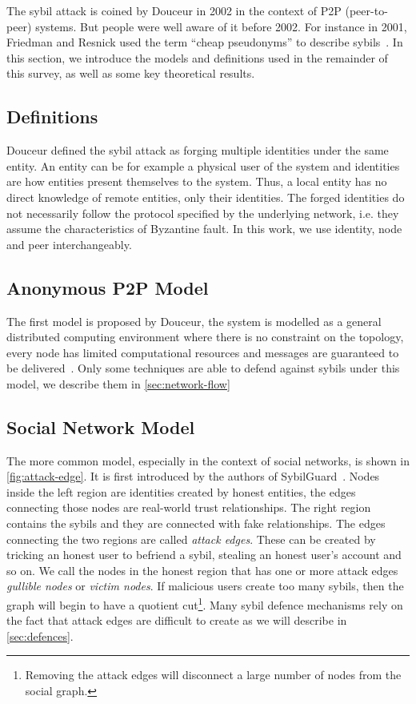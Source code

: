 The sybil attack is coined by Douceur\cite{douceur2002sybil} in 2002 in the
context of P2P (peer-to-peer) systems. But people were well aware of it before
2002. For instance in 2001, Friedman and Resnick used the term ``cheap
pseudonyms'' to describe sybils~\cite{resnick2001social}. In this section, we
introduce the models and definitions used in the remainder of this survey, as
well as some key theoretical results.

\subsection{Definitions}
Douceur defined the sybil attack as forging multiple identities under the same
entity\cite{douceur2002sybil}. An entity can be for example a physical user of
the system and identities are how entities present themselves to the system.
Thus, a local entity has no direct knowledge of remote entities, only their
identities. The forged identities do not necessarily follow the protocol
specified by the underlying network, i.e. they assume the characteristics of
Byzantine fault\cite{lamport1982byzantine}. In this work, we use identity, node
and peer interchangeably.

\subsection{Anonymous P2P Model}
The first model is proposed by Douceur, the system is modelled as a general
distributed computing environment where there is no constraint on the topology,
every node has limited computational resources and messages are guaranteed to be
delivered~\cite{douceur2002sybil}. Only some techniques are able to defend
against sybils under this model, we describe them in \autoref{sec:network-flow}

\subsection{Social Network Model}
The more common model, especially in the context of social networks, is shown in
\autoref{fig:attack-edge}. It is first introduced by the authors of
SybilGuard~\cite{yu2006sybilguard}. Nodes inside the left region are identities
created by honest entities, the edges connecting those nodes are real-world
trust relationships. The right region contains the sybils and they are connected
with fake relationships. The edges connecting the two regions are called
\emph{attack edges}. These can be created by tricking an honest user to befriend
a sybil, stealing an honest user's account and so on. We call the nodes in the
honest region that has one or more attack edges \emph{gullible nodes} or
\emph{victim nodes}. If malicious users create too many sybils, then the graph
will begin to have a quotient cut\footnote{Removing the attack edges will
  disconnect a large number of nodes from the social graph.}. Many sybil defence
mechanisms rely on the fact that attack edges are difficult to create as we will
describe in \autoref{sec:defences}.

